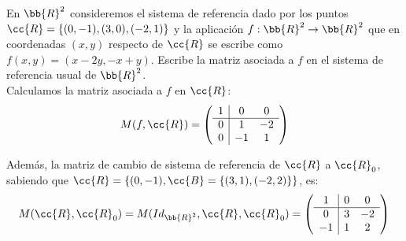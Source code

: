 \begin{ejercicio}
    En $\bb{R}^2$ consideremos el sistema de referencia dado por los puntos $\cc{R} = \{(0, -1), (3, 0), (-2, 1)\}$ y la aplicación $f : \bb{R}^2\to \bb{R}^2$ que en coordenadas $(x, y)$ respecto de $\cc{R}$ se escribe como $f (x, y) = (x-2y, -x+y)$. Escribe la matriz asociada a $f$ en el sistema de referencia usual de $\bb{R}^2$.\\

    Calculamos la matriz asociada a $f$ en $\cc{R}$:
    \begin{equation*}
        M(f,\cc{R}) = \left(\begin{array}{c|cc}
            1 & 0 & 0 \\ \hline
            0 & 1 & -2 \\
            0 & -1 & 1
        \end{array}\right)
    \end{equation*}

    Además, la matriz de cambio de sistema de referencia de $\cc{R}$ a $\cc{R}_0$, sabiendo que $\cc{R}=\{(0,-1),\cc{B}=\{(3,1), (-2, 2)\}\}$, es:
    \begin{equation*}
        M(\cc{R},\cc{R}_0)
        = M(Id_{\bb{R}^2},\cc{R},\cc{R}_0)
        = \left(
        \begin{array}{c|cc}
            1 & 0 & 0 \\ \hline
            0 & 3 & -2\\
            -1 & 1 & 2
        \end{array}
        \right)
    \end{equation*}


\end{ejercicio}
